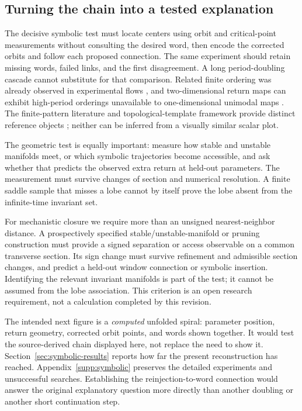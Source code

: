 \subsection{Turning the chain into a tested explanation}

The decisive symbolic test must locate centers using orbit and critical-point
measurements without consulting the desired word, then encode the corrected
orbits and follow each proposed connection. The same experiment should
retain missing words, failed links, and the first disagreement. A long
period-doubling cascade cannot substitute for that comparison.
Related finite ordering was already observed in experimental flows
\citep{lefranc1994combining}, and two-dimensional return maps can exhibit
high-period orderings unavailable to one-dimensional unimodal maps
\citep{holmes1984bifurcation}.
The finite-pattern literature and topological-template framework provide
distinct reference objects \citep{metropolis1973finite,gilmore1998topological};
neither can be inferred from a visually similar scalar plot.

The geometric test is equally important: measure how stable and unstable
manifolds meet, or which symbolic trajectories become accessible, and ask
whether that predicts the observed extra return at held-out parameters.
The measurement must survive changes of section and numerical resolution.
A finite saddle sample that misses a lobe cannot by itself prove the lobe
absent from the infinite-time invariant set.

For mechanistic closure we require more than an unsigned nearest-neighbor
distance. A prospectively specified stable/unstable-manifold or pruning
construction must provide a signed separation or access observable on a
common transverse section. Its sign change must survive refinement and
admissible section changes, and predict a held-out window connection or
symbolic insertion. Identifying the relevant invariant manifolds is part of
the test; it cannot be assumed from the lobe association. This criterion is
an open research requirement, not a calculation completed by this revision.

The intended next figure is a \emph{computed} unfolded spiral: parameter
position, return geometry, corrected orbit points, and words shown together.
It would test the source-derived chain displayed here, not replace the need
to show it. Section~\ref{sec:symbolic-results} reports how far the present
reconstruction has reached. Appendix~\ref{supp:symbolic} preserves the detailed experiments
and unsuccessful searches. Establishing the reinjection-to-word connection
would answer the original explanatory question more directly than another
doubling or another short continuation step.
